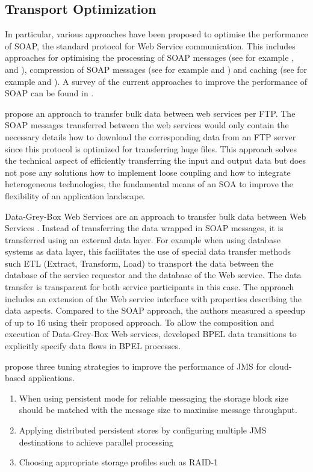 \subsection{Transport Optimization}

In particular, various approaches have been proposed to optimise the performance of SOAP, the standard protocol for Web Service communication. This includes approaches for optimising the processing of SOAP messages (see for example \citet{Abu-Ghazaleh:2005bs}, \citet{Suzumura:2005fv} and \citet{Ng:2006kl}), compression of SOAP messages (see for example \citet{Estrella:2008dz} and \citet{Ng:2005qa}) and caching (see for example \citet{andresen2004lye} and \citet{Devaram:2003fu}). A survey of the current approaches to improve the performance of SOAP can be found in \cite{Tekli:2012bh}.

\citet{Wichaiwong:2007oq} propose an approach to transfer bulk data between web services per FTP. The SOAP messages transferred between the web services would only contain the necessary details how to download the corresponding data from an FTP server since this protocol is optimized for transferring huge files. This approach solves the technical aspect of efficiently transferring the input and output data but does not pose any solutions how to implement loose coupling and how to integrate heterogeneous technologies, the fundamental means of an SOA to improve the flexibility of an application landscape.

Data-Grey-Box Web Services are an approach to transfer bulk data between Web Services \citep{Habich:2007ij}. Instead of transferring the data wrapped in SOAP messages, it is transferred using an external data layer. For example when using database systems as data layer, this facilitates the use of special data transfer methods such ETL (Extract, Transform, Load) to transport the data between the database of the service requestor and the database of the Web service. The data transfer is transparent for both service participants in this case. The approach includes an extension of the Web service interface with properties describing the data aspects. Compared to the SOAP approach, the authors measured a speedup of up to 16 using their proposed approach. To allow the composition and execution of Data-Grey-Box Web services,  \citet{Habich:kl} developed BPEL data transitions to explicitly specify data flows in BPEL processes.

\cite{Zhuang:2012qf} propose three tuning strategies to improve the performance of \ac{JMS} for cloud-based applications.
\begin{enumerate}
	\item When using persistent mode for reliable messaging the storage block size should be matched with the message size to maximise message throughput.
	\item Applying distributed persistent stores by configuring multiple JMS destinations to achieve parallel processing
	\item Choosing appropriate storage profiles such as RAID-1
\end{enumerate}

